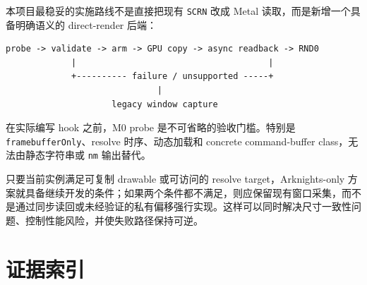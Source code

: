 \documentclass[UTF8,a4paper,11pt]{ctexart}
\begin{document}
本项目最稳妥的实施路线不是直接把现有 \texttt{SCRN} 改成 Metal 读取，而是新增一个具备明确语义的 direct-render 后端：

\begin{lstlisting}
probe -> validate -> arm -> GPU copy -> async readback -> RND0
             |                                      |
             +---------- failure / unsupported -----+
                              |
                     legacy window capture
\end{lstlisting}

在实际编写 hook 之前，M0 probe 是不可省略的验收门槛。特别是 \texttt{framebufferOnly}、resolve 时序、动态加载和 concrete command-buffer class，无法由静态字符串或 \texttt{nm} 输出替代。

只要当前实例满足可复制 drawable 或可访问的 resolve target，Arknights-only 方案就具备继续开发的条件；如果两个条件都不满足，则应保留现有窗口采集，而不是通过同步读回或未经验证的私有偏移强行实现。这样可以同时解决尺寸一致性问题、控制性能风险，并使失败路径保持可逆。

\appendix
\section{证据索引}
\end{document}
